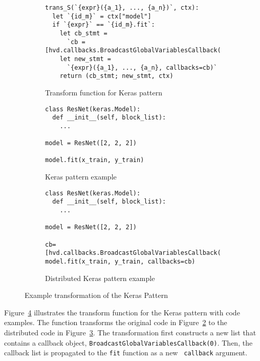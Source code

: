 \begin{figure}[ht!]\centering

\begin{subfigure}{1\textwidth}
\begin{lstlisting}[style=mpythonscript]
trans_S(`{expr}({a_1}, ..., {a_n})`, ctx):
  let `{id_m}` = ctx["model"]
  if `{expr}` == `{id_m}.fit`:
    let cb_stmt = 
      `cb = [hvd.callbacks.BroadcastGlobalVariablesCallback(root_rank=0)]`
    let new_stmt =
      `{expr}({a_1}, ..., {a_n}, callbacks=cb)`	
    return (cb_stmt; new_stmt, ctx) 
\end{lstlisting}
\caption{Transform function for Keras pattern}
\label{fig:trans:keras:fn}
\end{subfigure}

  \begin{subfigure}[t]{1\textwidth}
  \begin{lstlisting}[style=mpython]
class ResNet(keras.Model):
  def __init__(self, block_list):
    ...

model = ResNet([2, 2, 2])

model.fit(x_train, y_train)\end{lstlisting}
  \caption{Keras pattern example}
    \label{fig:trans:keras:a}
  \end{subfigure}
  \hspace{3mm}
  \begin{subfigure}[t]{1\textwidth}
  \begin{lstlisting}[style=mpython]
class ResNet(keras.Model):
  def __init__(self, block_list):
    ...

model = ResNet([2, 2, 2])

cb=[hvd.callbacks.BroadcastGlobalVariablesCallback(0)]
model.fit(x_train, y_train, callbacks=cb)
\end{lstlisting}
    \caption{Distributed Keras pattern example}
    \label{fig:trans:keras:b}
  \end{subfigure}
  \caption{Example transformation of the Keras Pattern}
  \label{fig:trans:keras}
\end{figure}


Figure~\ref{fig:trans:keras} illustrates the transform function for the Keras
pattern with code examples.
The function transforms the original code in Figure~\ref{fig:trans:keras:a}
to the distributed code in Figure~\ref{fig:trans:keras:b}.
The transformation first constructs a new list that contains a callback object,
{\tt BroadcastGlobalVariablesCallback(0)}.
Then, the callback list is propagated to the {\tt fit} function as a new {\tt
callback} argument.

